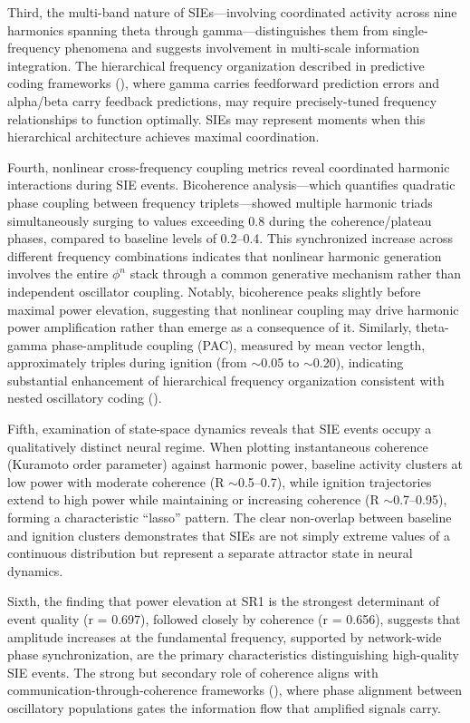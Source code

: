 \documentclass[11pt,a4paper]{article}
\begin{document}
Third, the multi-band nature of SIEs—involving coordinated activity across nine harmonics spanning theta through gamma—distinguishes them from single-frequency phenomena and suggests involvement in multi-scale information integration. The hierarchical frequency organization described in predictive coding frameworks (\cite{bastos2012canonical, friston2009predictive}), where gamma carries feedforward prediction errors and alpha/beta carry feedback predictions, may require precisely-tuned frequency relationships to function optimally. SIEs may represent moments when this hierarchical architecture achieves maximal coordination.

Fourth, nonlinear cross-frequency coupling metrics reveal coordinated harmonic interactions during SIE events. Bicoherence analysis—which quantifies quadratic phase coupling between frequency triplets—showed multiple harmonic triads simultaneously surging to values exceeding 0.8 during the coherence/plateau phases, compared to baseline levels of 0.2–0.4. This synchronized increase across different frequency combinations indicates that nonlinear harmonic generation involves the entire $\phi^n$ stack through a common generative mechanism rather than independent oscillator coupling. Notably, bicoherence peaks slightly before maximal power elevation, suggesting that nonlinear coupling may drive harmonic power amplification rather than emerge as a consequence of it. Similarly, theta-gamma phase-amplitude coupling (PAC), measured by mean vector length, approximately triples during ignition (from $\sim$0.05 to $\sim$0.20), indicating substantial enhancement of hierarchical frequency organization consistent with nested oscillatory coding (\cite{lisman2013thetagamma}).

Fifth, examination of state-space dynamics reveals that SIE events occupy a qualitatively distinct neural regime. When plotting instantaneous coherence (Kuramoto order parameter) against harmonic power, baseline activity clusters at low power with moderate coherence (R $\sim$0.5–0.7), while ignition trajectories extend to high power while maintaining or increasing coherence (R $\sim$0.7–0.95), forming a characteristic ``lasso'' pattern. The clear non-overlap between baseline and ignition clusters demonstrates that SIEs are not simply extreme values of a continuous distribution but represent a separate attractor state in neural dynamics.

Sixth, the finding that power elevation at SR1 is the strongest determinant of event quality (r = 0.697), followed closely by coherence (r = 0.656), suggests that amplitude increases at the fundamental frequency, supported by network-wide phase synchronization, are the primary characteristics distinguishing high-quality SIE events. The strong but secondary role of coherence aligns with communication-through-coherence frameworks (\cite{fries2015rhythms}), where phase alignment between oscillatory populations gates the information flow that amplified signals carry.
\end{document}
